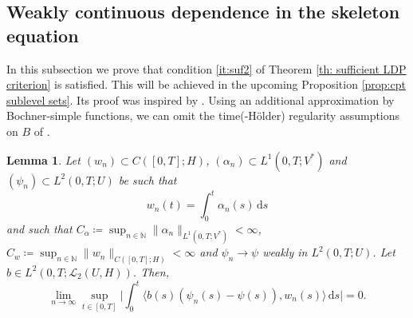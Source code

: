 \documentclass{amsart}
\newcommand{\dd}{\,\mathrm{d}}
\newcommand{\UH}{\mathcal{L}_2(U,H)}
\newcommand{\<}{\langle}
\newcommand{\?}{\rangle}
\theoremstyle{plain}
\theoremstyle{remark}
\theoremstyle{plain}
\newtheorem{lemma}[theorem]{Lemma}
\numberwithin{equation}{section}
\def\N{{\mathbb N}}
\begin{document}
\subsection{Weakly continuous dependence in the skeleton equation}\label{ss:weakskeleton}

In this subsection we prove that condition \ref{it:suf2} of Theorem \ref{th: sufficient LDP criterion} is satisfied.
This will be achieved in the upcoming Proposition \ref{prop:cpt sublevel sets}.
Its proof
was inspired by \cite[Th. 3.2]{hongliliu21}.
Using an additional approximation by Bochner-simple functions, we can omit the time(-H\"older) regularity assumptions on $B$ of  \cite[(H5)]{hongliliu21}.

\begin{lemma}\label{lem: I_3 to zero}
Let $(w_n)\subset C([0,T];H)$, $(\alpha_n) \subset L^1(0,T;V^*)$ and $(\psi_n)\subset L^2(0,T;U)$ be such that
\[
w_n(t) = \int_0^t \alpha_n(s) \dd s
\] and such that $C_\alpha\coloneqq\sup_{n\in\N}\|\alpha_n\|_{L^1(0,T;V^*)}<\infty$,  $C_w\coloneqq\sup_{n\in\N}\|w_n\|_{C([0,T];H)}<\infty$ and $\psi_n\to \psi$ weakly in $L^2(0,T;U)$. Let ${b} \in L^2(0,T;\UH)$.
Then,
\begin{equation}\label{eq: weak conv lemma}
\lim_{n\to\infty}\sup_{t\in[0,T]}\Big|\int_0^t \<{b}(s)(\psi_n(s)-\psi(s)),w_n(s)\?\dd s\Big|=0.
\end{equation}
\end{lemma}
\end{document}
